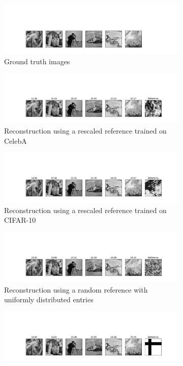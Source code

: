 \begin{figure}
	\begin{subfigure}{\textwidth}
		\centering
		\includegraphics[trim=270 35 270 200, width=9.5cm]{data/original-std.pdf}
		\caption{Ground truth images}
	\end{subfigure}
	\begin{subfigure}{\textwidth}
		\centering
		\includegraphics[trim=270 35 270 120, width=9.5cm]{data/rec-celeb-std.pdf}
		\caption{Reconstruction using a rescaled reference trained on CelebA}
	\end{subfigure}
	\begin{subfigure}{\textwidth}
		\centering
		\includegraphics[trim=270 35 270 120, width=9.5cm]{data/rec-cifar-std.pdf}
		\caption{Reconstruction using a rescaled reference trained on CIFAR-10}
	\end{subfigure}
	\begin{subfigure}{\textwidth}
		\centering
		\includegraphics[trim=270 35 270 120, width=9.5cm]{data/rec-random-std.pdf}
		\caption{Reconstruction using a random reference with uniformly distributed entries}
	\end{subfigure}
	\begin{subfigure}{\textwidth}
		\centering
		\includegraphics[trim=270 35 270 120, width=9.5cm]{data/rec-geometric-std.pdf}

\end{subfigure}
\end{figure}
